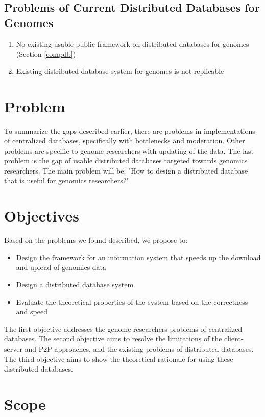 \documentclass[acmsmall]{acmart}
\begin{document}
\begin{multicols}{2}
\begin{enumerate}
\end{enumerate}

\subsection{Problems of Current Distributed Databases for Genomes}
\begin{enumerate}
    \item No existing usable public framework on distributed databases for genomes (Section \ref{compdb})
    \item Existing distributed database system for genomes is not replicable 
\end{enumerate}

\section{Problem}
To summarize the gaps described earlier, there are problems in implementations of centralized databases, specifically with bottlenecks and moderation. Other problems are specific to genome researchers with updating of the data. The last problem is the gap of usable distributed databases targeted towards genomics researchers. The main problem will be: "How to design a distributed database that is useful for genomics researchers?"

\section{Objectives}
Based on the problems we found described, we propose to:

\begin{itemize}
    \item Design the framework for an information system that speeds up the download and upload of genomics data
    \item  Design a distributed database system
    \item Evaluate the theoretical properties of the system based on the correctness and speed
\end{itemize}

The first objective addresses the genome researchers problems of centralized databases. The second objective aims to resolve the limitations of the client-server and P2P approaches, and the existing problems of distributed databases. The third objective aims to show the theoretical rationale for using these distributed databases. 


\section{Scope}


\end{multicols}
\end{document}
